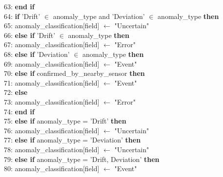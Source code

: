 \begin{breakablealgorithm}
\begin{flushleft}
63: \hspace{1.5em} \textbf{end if} \\
64: \hspace{1.5em} \textbf{if} 'Drift' $\in$ anomaly\_type and 'Deviation' $\in$ anomaly\_type \textbf{then} \\
65: \hspace{2em} anomaly\_classification[field] $\gets$ "Uncertain" \\
66: \hspace{1.5em} \textbf{else if} 'Drift' $\in$ anomaly\_type \textbf{then} \\
67: \hspace{2em} anomaly\_classification[field] $\gets$ "Error" \\
68: \hspace{1.5em} \textbf{else if} 'Deviation' $\in$ anomaly\_type \textbf{then} \\
69: \hspace{2em} anomaly\_classification[field] $\gets$ "Event" \\
70: \hspace{1.5em} \textbf{else if} confirmed\_by\_nearby\_sensor \textbf{then} \\
71: \hspace{2em} anomaly\_classification[field] $\gets$ "Event" \\
72: \hspace{1.5em} \textbf{else} \\
73: \hspace{2em} anomaly\_classification[field] $\gets$ "Error" \\
74: \hspace{1.5em} \textbf{end if} \\
75: \hspace{1em} \textbf{else if} anomaly\_type = 'Drift' \textbf{then} \\
76: \hspace{1.5em} anomaly\_classification[field] $\gets$ "Uncertain" \\
77: \hspace{1em} \textbf{else if} anomaly\_type = 'Deviation' \textbf{then} \\
78: \hspace{1.5em} anomaly\_classification[field] $\gets$ "Uncertain" \\
79: \hspace{1em} \textbf{else if} anomaly\_type = 'Drift, Deviation' \textbf{then} \\
80: \hspace{1.5em} anomaly\_classification[field] $\gets$ "Event" \\

\end{flushleft}
\end{breakablealgorithm}
